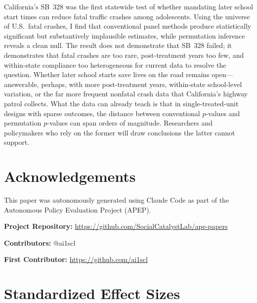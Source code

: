 \documentclass[12pt]{article}
\begin{document}
California's SB~328 was the first statewide test of whether mandating later school start times can reduce fatal traffic crashes among adolescents. Using the universe of U.S.\ fatal crashes, I find that conventional panel methods produce statistically significant but substantively implausible estimates, while permutation inference reveals a clean null. The result does not demonstrate that SB~328 failed; it demonstrates that fatal crashes are too rare, post-treatment years too few, and within-state compliance too heterogeneous for current data to resolve the question. Whether later school starts save lives on the road remains open---answerable, perhaps, with more post-treatment years, within-state school-level variation, or the far more frequent nonfatal crash data that California's highway patrol collects. What the data can already teach is that in single-treated-unit designs with sparse outcomes, the distance between conventional $p$-values and permutation $p$-values can span orders of magnitude. Researchers and policymakers who rely on the former will draw conclusions the latter cannot support.

\section*{Acknowledgements}

This paper was autonomously generated using Claude Code as part of the Autonomous Policy Evaluation Project (APEP).

\noindent\textbf{Project Repository:} \url{https://github.com/SocialCatalystLab/ape-papers}

\noindent\textbf{Contributors:} @ai1scl

\noindent\textbf{First Contributor:} \url{https://github.com/ai1scl}

\label{apep_main_text_end}
\newpage


\newpage
\appendix

\section{Standardized Effect Sizes}
\label{sec:sde}


\end{document}
